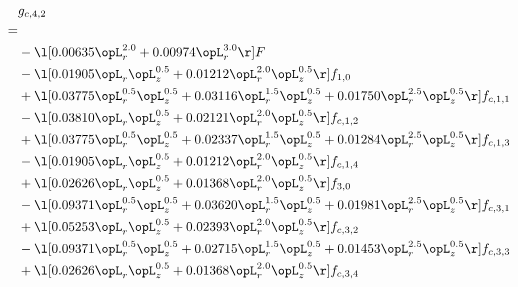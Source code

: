\begin{alignat}{2} 
\label{eq:g_42_0} 
& g_{c,4,2} \nonumber \\ 
 = \\ 
& - \l[  0.00635 \opL_r^{2.0} +  0.00974 \opL_r^{3.0}  \r] F \nonumber \\ 
& - \l[  0.01905 \opL_r \opL_z^{0.5} +  0.01212 \opL_r^{2.0} \opL_z^{0.5}  \r] f_{1,0} \nonumber \\ 
& + \l[  0.03775 \opL_r^{0.5} \opL_z^{0.5} +  0.03116 \opL_r^{1.5} \opL_z^{0.5} +  0.01750 \opL_r^{2.5} \opL_z^{0.5}  \r] f_{c,1,1} \nonumber \\ 
& - \l[  0.03810 \opL_r \opL_z^{0.5} +  0.02121 \opL_r^{2.0} \opL_z^{0.5}  \r] f_{c,1,2} \nonumber \\ 
& + \l[  0.03775 \opL_r^{0.5} \opL_z^{0.5} +  0.02337 \opL_r^{1.5} \opL_z^{0.5} +  0.01284 \opL_r^{2.5} \opL_z^{0.5}  \r] f_{c,1,3} \nonumber \\ 
& - \l[  0.01905 \opL_r \opL_z^{0.5} +  0.01212 \opL_r^{2.0} \opL_z^{0.5}  \r] f_{c,1,4} \nonumber \\ 
& + \l[  0.02626 \opL_r \opL_z^{0.5} +  0.01368 \opL_r^{2.0} \opL_z^{0.5}  \r] f_{3,0} \nonumber \\ 
& - \l[  0.09371 \opL_r^{0.5} \opL_z^{0.5} +  0.03620 \opL_r^{1.5} \opL_z^{0.5} +  0.01981 \opL_r^{2.5} \opL_z^{0.5}  \r] f_{c,3,1} \nonumber \\ 
& + \l[  0.05253 \opL_r \opL_z^{0.5} +  0.02393 \opL_r^{2.0} \opL_z^{0.5}  \r] f_{c,3,2} \nonumber \\ 
& - \l[  0.09371 \opL_r^{0.5} \opL_z^{0.5} +  0.02715 \opL_r^{1.5} \opL_z^{0.5} +  0.01453 \opL_r^{2.5} \opL_z^{0.5}  \r] f_{c,3,3} \nonumber \\ 
& + \l[  0.02626 \opL_r \opL_z^{0.5} +  0.01368 \opL_r^{2.0} \opL_z^{0.5}  \r] f_{c,3,4} \nonumber \\ 
\end{alignat} 


